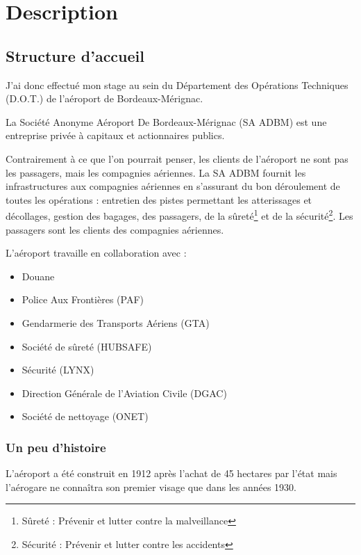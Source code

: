 \chapter{Description}

\section{Structure d'accueil}

J’ai donc effectué mon stage au sein du Département des Opérations Techniques (D.O.T.) de l’aéroport de Bordeaux-Mérignac.

La Société Anonyme Aéroport De Bordeaux-Mérignac (SA ADBM) est une entreprise privée à capitaux et actionnaires publics.\newline

Contrairement à ce que l’on pourrait penser, les clients de l’aéroport ne sont pas les passagers, mais les compagnies aériennes. La SA ADBM fournit les infrastructures aux compagnies aériennes en s’assurant du bon déroulement de toutes les opérations : entretien des pistes permettant les atterissages et décollages, gestion des bagages, des passagers, de la sûreté\footnote{Sûreté : Prévenir et lutter contre la malveillance} et de la sécurité\footnote{Sécurité : Prévenir et lutter contre les accidents}. Les passagers sont les clients des compagnies aériennes.\newline

L’aéroport travaille en collaboration avec :


\begin{itemize}
  \item Douane
  \item Police Aux Frontières (PAF)
  \item Gendarmerie des Transports Aériens (GTA)
  \item Société de sûreté (HUBSAFE)
  \item Sécurité (LYNX)
  \item Direction Générale de l'Aviation Civile (DGAC)
  \item Société de nettoyage (ONET)\newline
\end{itemize}


\subsection{Un peu d'histoire}

L'aéroport a été construit en 1912 après l'achat de 45 hectares par l'état mais l'aérogare ne connaîtra son premier visage que dans les années 1930.

